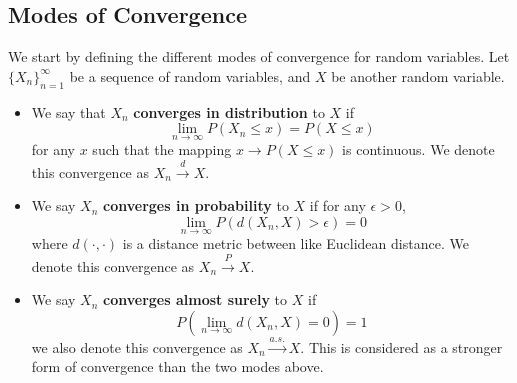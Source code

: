 \documentclass{article}
\begin{document}
\subsection{Modes of Convergence}

We start by defining the different modes of convergence for random variables. Let $\{X_n\}_{n=1}^{\infty}$ be a sequence of random variables, and $X$ be another random variable.

\begin{itemize}
    \item We say that $X_n$ \textbf{converges in distribution} to $X$ if
          \begin{equation}
              \lim_{n \rightarrow \infty} P(X_n \leq x) = P(X \leq x)
          \end{equation}
          for any $x$ such that the mapping $x \to P(X \leq x)$ is continuous. We denote this convergence as $X_n \xrightarrow{d} X$.

    \item We say $X_n$ \textbf{converges in probability} to $X$ if for any $\epsilon > 0$,
          \begin{equation}
              \lim_{n \rightarrow \infty} P(d(X_n, X) > \epsilon) = 0
          \end{equation}
          where $d(\cdot, \cdot)$ is a distance metric between like Euclidean distance. We denote this convergence as $X_n \xrightarrow{P} X$.

    \item We say $X_n$ \textbf{converges almost surely} to $X$ if
          \begin{equation}
              P\left(\lim_{n \rightarrow \infty} d(X_n, X) = 0  \right) = 1
          \end{equation}
          we also denote this convergence as $X_n \xrightarrow{a.s.} X$. This is considered as a stronger form of convergence than the two modes above.
\end{itemize}
\end{document}
